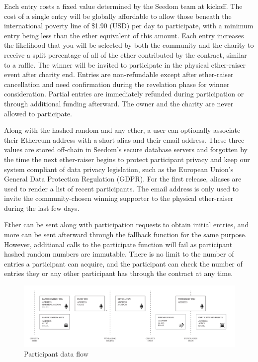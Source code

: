 \documentclass[11pt]{article}
\begin{document}
Each entry costs a fixed value determined by the Seedom team at kickoff. The cost of a single entry will be globally affordable to allow those beneath the international poverty line of \$1.90 (USD) per day \cite{1} to participate, with a minimum entry being less than the ether equivalent of this amount. Each entry increases the likelihood that you will be selected by both the community and the charity to receive a split percentage of all of the ether contributed by the contract, similar to a raffle. The winner will be invited to participate in the physical ether-raiser event after charity end. Entries are non-refundable except after ether-raiser cancellation and need confirmation during the revelation phase for winner consideration. Partial entries are immediately refunded during participation or through additional funding afterward. The owner and the charity are never allowed to participate.

Along with the hashed random and any ether, a user can optionally associate their Ethereum address with a short alias and their email address. These three values are stored off-chain in Seedom's secure database servers and forgotten by the time the next ether-raiser begins to protect participant privacy and keep our system compliant of data privacy legislation, such as the European Union's General Data Protection Regulation (GDPR). For the first release, aliases are used to render a list of recent participants. The email address is only used to invite the community-chosen winning supporter to the physical ether-raiser during the last few days.

Ether can be sent along with participation requests to obtain initial entries, and more can be sent afterward through the fallback function for the same purpose. However, additional calls to the participate function will fail as participant hashed random numbers are immutable. There is no limit to the number of entries a participant can acquire, and the participant can check the number of entries they or any other participant has through the contract at any time.

\begin{figure}[H]
\begin{center}
\includegraphics[width=1.0\textwidth]{participantDataFlow.pdf}
\caption{Participant data flow}
\label{figure:participantDataFlow}
\end{center}
\end{figure}
\end{document}
